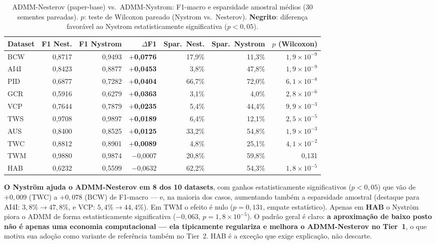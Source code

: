 \documentclass[12pt,a4paper]{article}
\begin{document}
\begin{table}[H]
\centering
\caption{ADMM-Nesterov (paper-base) vs.\ ADMM-Nystrom: F1-macro e esparsidade
amostral médios (30 sementes pareadas). $p$: teste de Wilcoxon pareado
(Nystrom vs.\ Nesterov). \textbf{Negrito}: diferença favorável ao Nystrom
estatisticamente significativa ($p<0{,}05$).}
\label{tab:admm_nystrom_helps}
\begin{tabular}{lrrrrrr}
\toprule
\textbf{Dataset} & \textbf{F1 Nest.} & \textbf{F1 Nystrom} & \textbf{$\Delta$F1}
  & \textbf{Spar.\ Nest.} & \textbf{Spar.\ Nystrom} & \textbf{$p$ (Wilcoxon)} \\
\midrule
BCW  & 0,8717 & 0,9493 & \textbf{$+$0,0776} & 17,9\% & 11,3\% & $1{,}9\times10^{-9}$ \\
AI4I & 0,8423 & 0,8877 & \textbf{$+$0,0453} & 3,8\%  & 47,8\% & $1{,}9\times10^{-9}$ \\
PID  & 0,6877 & 0,7282 & \textbf{$+$0,0404} & 66,7\% & 72,0\% & $6{,}1\times10^{-8}$ \\
GCR  & 0,5916 & 0,6279 & \textbf{$+$0,0363} & 3,1\%  & 4,0\%  & $2{,}8\times10^{-6}$ \\
VCP  & 0,7644 & 0,7879 & \textbf{$+$0,0235} & 5,4\%  & 44,4\% & $9{,}9\times10^{-3}$ \\
TWS  & 0,9708 & 0,9897 & \textbf{$+$0,0189} & 6,4\%  & 12,1\% & $2{,}5\times10^{-5}$ \\
AUS  & 0,8400 & 0,8525 & \textbf{$+$0,0125} & 33,2\% & 54,8\% & $1{,}9\times10^{-3}$ \\
TWC  & 0,8812 & 0,8901 & \textbf{$+$0,0089} & 4,8\%  & 25,1\% & $4{,}1\times10^{-2}$ \\
TWM  & 0,9880 & 0,9874 & $-$0,0007 & 20,8\% & 59,8\% & 0,131 \\
HAB  & 0,6232 & 0,5599 & $-$0,0632 & 62,2\% & 54,3\% & $1{,}8\times10^{-5}$ \\
\bottomrule
\end{tabular}
\end{table}

\textbf{O Nyström ajuda o ADMM-Nesterov em 8 dos 10 datasets}, com ganhos
estatisticamente significativos ($p<0{,}05$) que vão de $+0{,}009$ (TWC) a
$+0{,}078$ (BCW) de F1-macro --- e, na maioria dos casos, aumentando também a
esparsidade amostral (destaque para AI4I: $3{,}8\% \to 47{,}8\%$, e VCP:
$5{,}4\% \to 44{,}4\%$). Em TWM o efeito é nulo ($p=0{,}131$, empate
estatístico). Apenas em \textbf{HAB} o Nyström piora o ADMM de forma
estatisticamente significativa ($-0{,}063$, $p=1{,}8\times10^{-5}$).
O padrão geral é claro: \textbf{a aproximação de baixo posto não é apenas uma
economia computacional --- ela tipicamente regulariza e melhora o ADMM-Nesterov
no Tier~1}, o que motiva sua adoção como variante de referência também no
Tier~2. HAB é a exceção que exige explicação, não descarte.
\end{document}

